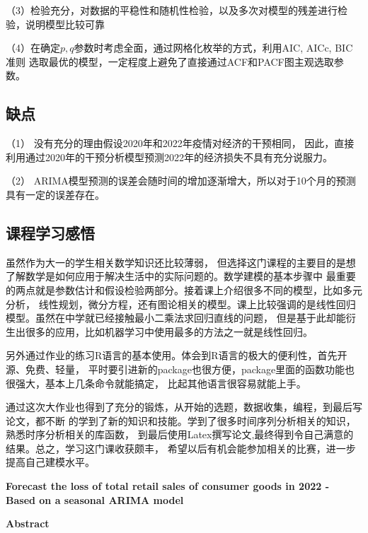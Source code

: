 \documentclass[12pt,a4paper]{nmmcm}
\begin{document}
  （3）检验充分，对数据的平稳性和随机性检验，以及多次对模型的残差进行检验，说明模型比较可靠

  （4）在确定\(p,q\)参数时考虑全面，通过网格化枚举的方式，利用AIC, AICc, BIC准则 
  选取最优的模型，一定程度上避免了直接通过ACF和PACF图主观选取参数。

  \subsection{缺点}
  （1） 没有充分的理由假设2020年和2022年疫情对经济的干预相同，
  因此，直接利用通过2020年的干预分析模型预测2022年的经济损失不具有充分说服力。

  （2） ARIMA模型预测的误差会随时间的增加逐渐增大，所以对于10个月的预测
  具有一定的误差存在。
\subsection*{课程学习感悟}
  虽然作为大一的学生相关数学知识还比较薄弱，
  但选择这门课程的主要目的是想了解数学是如何应用于解决生活中的实际问题的。数学建模的基本步骤中
  最重要的两点就是参数估计和假设检验两部分。接着课上介绍很多不同的模型，比如多元分析，
  线性规划，微分方程，还有图论相关的模型。课上比较强调的是线性回归模型。虽然在中学就已经接触最小二乘法求回归直线的问题，
  但是基于此却能衍生出很多的应用，比如机器学习中使用最多的方法之一就是线性回归。
  
  另外通过作业的练习R语言的基本使用。体会到R语言的极大的便利性，首先开源、免费、轻量，
  平时要引进新的package也很方便，package里面的函数功能也很强大，基本上几条命令就能搞定，
  比起其他语言很容易就能上手。

  通过这次大作业也得到了充分的锻炼，从开始的选题，数据收集，编程，到最后写论文，都不断
  的学到了新的知识和技能。学到了很多时间序列分析相关的知识，熟悉时序分析相关的库函数，
  到最后使用Latex撰写论文,最终得到令自己满意的结果。总之，学习这门课收获颇丰，
  希望以后有机会能参加相关的比赛，进一步提高自己建模水平。



\newpage




\newpage
  \begin{center}
    \large{\textbf{Forecast the loss of total retail sales of consumer goods in 2022
     - Based on a seasonal ARIMA model}}


    \textbf{Abstract}
  \end{center}
  

\newpage
\end{document}
